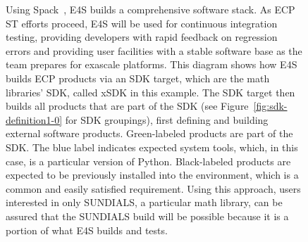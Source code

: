 \begin{figure}[H]
		\centering
	\caption{Using Spack~\cite{gamblin+:ecp18-spack-tutorial}, E4S builds a comprehensive software stack.  As ECP ST efforts proceed, E4S will be used for continuous integration testing, providing developers with rapid feedback on regression errors and providing user facilities with a stable software base as the team prepares for exascale platforms.  This diagram shows how E4S builds ECP products via an SDK target, which are the math libraries' SDK, called xSDK in this example.  The SDK target then builds all products that are part of the SDK (see Figure~\ref{fig:sdk-definition1-0} for SDK groupings), first defining and building external software products. Green-labeled products are part of the SDK. The blue label indicates expected system tools, which, in this case, is a particular version of Python.  Black-labeled products are expected to be previously installed into the environment, which is a common and easily satisfied requirement.  Using this approach, users interested in only SUNDIALS, a particular math library, can be assured that the SUNDIALS build will be possible because it is a portion of what E4S builds and tests.}
	\label{fig:e4s-build-tree}
\end{figure}

